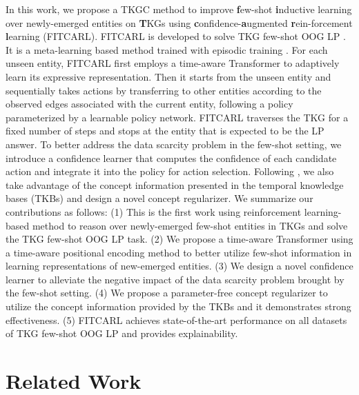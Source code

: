 \documentclass[runningheads]{llncs}
\begin{document}
In this work, we propose a TKGC method to improve \textbf{f}ew-shot \textbf{i}nductive learning over newly-emerged entities on \textbf{T}KGs using \textbf{c}onfidence-\textbf{a}ugmented \textbf{r}ein-forcement \textbf{l}earning (FITCARL). FITCARL is developed to solve TKG few-shot OOG LP \cite{ding2022few}. 
It is a meta-learning based method trained with episodic training \cite{DBLP:conf/nips/VinyalsBLKW16}. 
For each unseen entity, FITCARL first employs a time-aware Transformer \cite{DBLP:conf/nips/VaswaniSPUJGKP17} to adaptively learn its expressive representation. Then it starts from the unseen entity and sequentially takes actions by transferring to other entities according to the observed edges associated with the current entity, following a policy parameterized by a learnable policy network. FITCARL traverses the TKG for a fixed number of steps and stops at the entity that is expected to be the LP answer. To better address the data scarcity problem in the few-shot setting, we introduce a confidence learner that computes the confidence of each candidate action and integrate it into the policy for action selection. Following \cite{ding2022few}, we also take advantage of the concept information presented in the temporal knowledge bases (TKBs) and design a novel concept regularizer. 
We summarize our contributions as follows:
(1) This is the first work using reinforcement learning-based method to reason over newly-emerged few-shot entities in TKGs and solve the TKG few-shot OOG LP task.
(2) We propose a time-aware Transformer using a time-aware positional encoding method to better utilize few-shot information in learning representations of new-emerged entities.
(3) We design a novel confidence learner to alleviate the negative impact of the data scarcity problem brought by the few-shot setting. 
(4) We propose a parameter-free concept regularizer to utilize the concept information provided by the TKBs and it demonstrates strong effectiveness.
(5) FITCARL achieves state-of-the-art performance on all datasets of TKG few-shot OOG LP and provides explainability. 

\section{Related Work}
\end{document}

